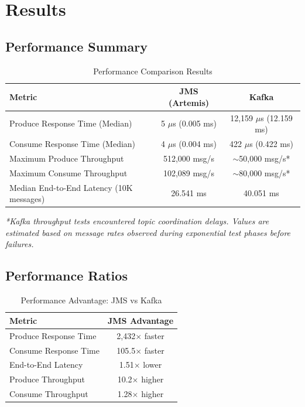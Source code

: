 \documentclass[11pt,a4paper]{article}
\begin{document}
\newpage
\section{Results}

\subsection{Performance Summary}

\begin{table}[H]
\centering
\caption{Performance Comparison Results}
\label{tab:results}
\begin{tabular}{@{}lcc@{}}
\toprule
\textbf{Metric} & \textbf{JMS (Artemis)} & \textbf{Kafka} \\
\midrule
Produce Response Time (Median) & 5 $\mu$s (0.005 ms) & 12,159 $\mu$s (12.159 ms) \\
Consume Response Time (Median) & 4 $\mu$s (0.004 ms) & 422 $\mu$s (0.422 ms) \\
Maximum Produce Throughput & 512,000 msg/s & $\sim$50,000 msg/s* \\
Maximum Consume Throughput & 102,089 msg/s & $\sim$80,000 msg/s* \\
Median End-to-End Latency (10K messages) & 26.541 ms & 40.051 ms \\
\bottomrule
\end{tabular}
\end{table}

\textit{*Kafka throughput tests encountered topic coordination delays. Values are estimated based on message rates observed during exponential test phases before failures.}

\subsection{Performance Ratios}

\begin{table}[H]
\centering
\caption{Performance Advantage: JMS vs Kafka}
\begin{tabular}{@{}lc@{}}
\toprule
\textbf{Metric} & \textbf{JMS Advantage} \\
\midrule
Produce Response Time & 2,432$\times$ faster \\
Consume Response Time & 105.5$\times$ faster \\
End-to-End Latency & 1.51$\times$ lower \\
Produce Throughput & 10.2$\times$ higher \\
Consume Throughput & 1.28$\times$ higher \\
\bottomrule
\end{tabular}
\end{table}
\end{document}
